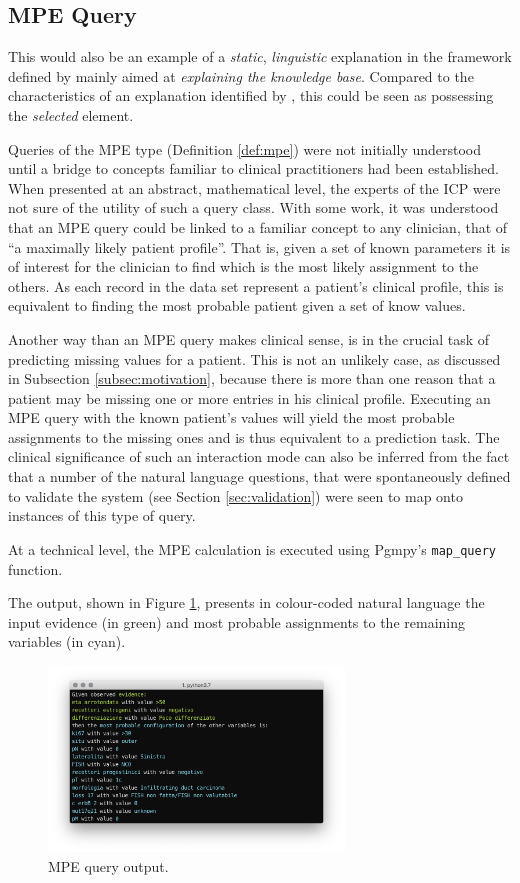 \subsection{MPE Query}
This would also be an example of a \textit{static}, \textit{linguistic} explanation in the framework defined by \citet{lacave2002review} mainly aimed at \textit{explaining the knowledge base}.
Compared to the characteristics of an explanation identified by \citet{miller2018explanation}, this could be seen as possessing the \textit{selected} element.

Queries of the MPE type (Definition \ref{def:mpe}) were not initially understood until a bridge to concepts familiar to clinical practitioners had been established.
When presented at an abstract, mathematical level, the experts of the ICP were not sure of the utility of such a query class.
With some work, it was understood that an MPE query could be linked to a familiar concept to any clinician, that of \enquote{a maximally likely patient profile}.
That is, given a set of known parameters it is of interest for the clinician to find which is the most likely assignment to the others.
As each record in the data set represent a patient's clinical profile, this is equivalent to finding the most probable patient given a set of know values.

Another way than an MPE query makes clinical sense, is in the crucial task of predicting missing values for a patient.
This is not an unlikely case, as discussed in Subsection \ref{subsec:motivation}, because there is more than one reason that a patient may be missing one or more entries in his clinical profile.
Executing an MPE query with the known patient's values will yield the most probable assignments to the missing ones and is thus equivalent to a prediction task.
The clinical significance of such an interaction mode can also be inferred from the fact that a number of the natural language questions, that were spontaneously defined to validate the system (see Section \ref{sec:validation}) were seen to map onto instances of this type of query.

At a technical level, the MPE calculation is executed using Pgmpy's \texttt{map\_query} function. 

The output, shown in Figure \ref{fig:sw_4_mpe}, presents in colour-coded natural language the input evidence (in green) and most probable assignments to the remaining variables (in cyan).

\begin{figure}[htbp]
\centerline{\includegraphics[width=0.7\textwidth]{results/images/sw_4_mpe}}
\caption{MPE query output.}
\label{fig:sw_4_mpe}
\end{figure}

